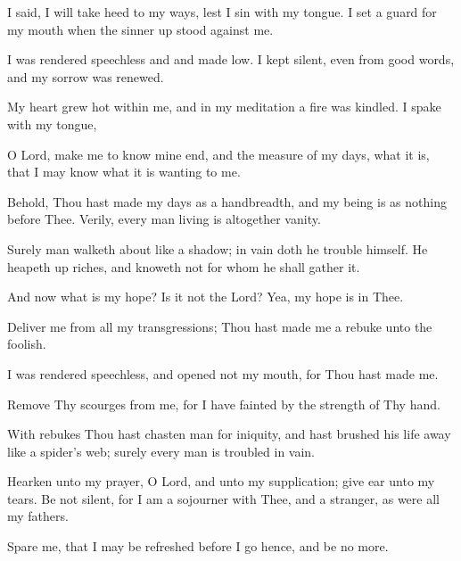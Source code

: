 I said, I will take heed to my ways, lest I sin with my tongue. I set a guard for my mouth when the sinner up stood against me.

I was rendered speechless and and made low. I kept silent, even from good words, and my sorrow was renewed.

My heart grew hot within me, and in my meditation a fire was kindled. I spake with my tongue,

O Lord, make me to know mine end, and the measure of my days, what it is, that I may know what it is wanting to me.

Behold, Thou hast made my days as a handbreadth, and my being is as nothing before Thee. Verily, every man living is altogether vanity.

Surely man walketh about like a shadow; in vain doth he trouble himself. He heapeth up riches, and knoweth not for whom he shall gather it.

And now what is my hope? Is it not the Lord? Yea, my hope is in Thee.

Deliver me from all my transgressions; Thou hast made me a rebuke unto the foolish.

I was rendered speechless, and opened not my mouth, for Thou hast made me.

Remove Thy scourges from me, for I have fainted by the strength of Thy hand.

With rebukes Thou hast chasten man for iniquity, and hast brushed his life away like a spider's web; surely every man is troubled in vain.

Hearken unto my prayer, O Lord, and unto my supplication; give ear unto my tears. Be not silent, for I am a sojourner with Thee, and a stranger, as were all my fathers.

Spare me, that I may be refreshed before I go hence, and be no more.
